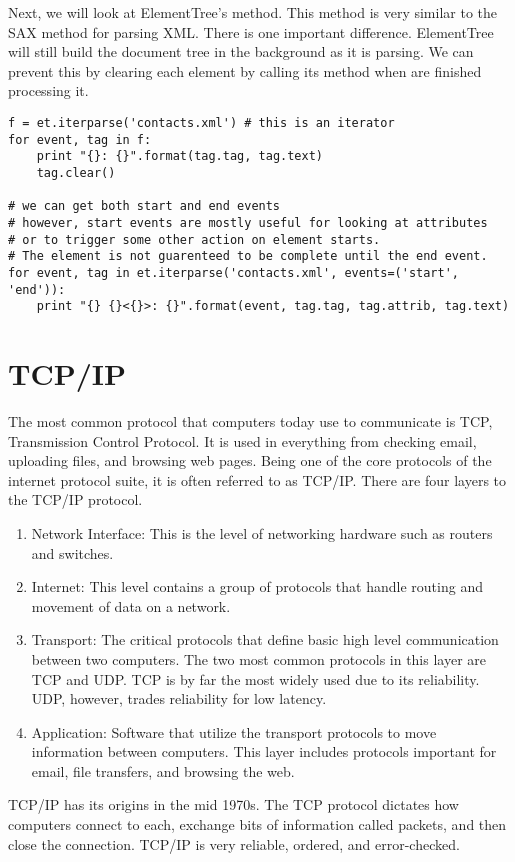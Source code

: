 Next, we will look at ElementTree's  method.
This method is very similar to the SAX method for parsing XML.
There is one important difference.
ElementTree will still build the document tree in the background as it is parsing.
We can prevent this by clearing each element by calling its  method when are finished processing it.
\begin{lstlisting}
f = et.iterparse('contacts.xml') # this is an iterator
for event, tag in f:
    print "{}: {}".format(tag.tag, tag.text)
    tag.clear()
    
# we can get both start and end events
# however, start events are mostly useful for looking at attributes
# or to trigger some other action on element starts.
# The element is not guarenteed to be complete until the end event.
for event, tag in et.iterparse('contacts.xml', events=('start', 'end')):
    print "{} {}<{}>: {}".format(event, tag.tag, tag.attrib, tag.text)
\end{lstlisting}


\section*{TCP/IP}
The most common protocol that computers today use to communicate is TCP, Transmission Control Protocol.
It is used in everything from checking email, uploading files, and browsing web pages.
Being one of the core protocols of the internet protocol suite, it is often referred to as TCP/IP.
There are four layers to the TCP/IP protocol.
\begin{enumerate}
\item Network Interface: This is the level of networking hardware such as routers and switches.
\item Internet: This level contains a group of protocols that handle routing and movement of data on a network.
\item Transport: The critical protocols that define basic high level communication between two computers.
The two most common protocols in this layer are TCP and UDP.  TCP is by far the most widely used due to its reliability.
UDP, however, trades reliability for low latency.
\item Application: Software that utilize the transport protocols to move information between computers.
This layer includes protocols important for email, file transfers, and browsing the web.
\end{enumerate}

TCP/IP has its origins in the mid 1970s.
The TCP protocol dictates how computers connect to each, exchange bits of information called packets, and then close the connection.
TCP/IP is very reliable, ordered, and error-checked.

